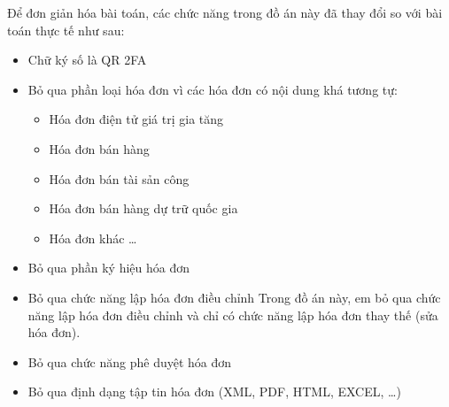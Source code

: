 Để đơn giản hóa bài toán, các chức năng trong đồ án này đã thay đổi so với bài toán thực tế như sau:

\begin{itemize}

    \item Chữ ký số là QR 2FA





    \item Bỏ qua phần loại hóa đơn vì các hóa đơn có nội dung khá tương tự:

          \begin{itemize}

              \item Hóa đơn điện tử giá trị gia tăng

              \item Hóa đơn bán hàng

              \item Hóa đơn bán tài sản công

              \item Hóa đơn bán hàng dự trữ quốc gia

              \item Hóa đơn khác \dots

          \end{itemize}

    \item Bỏ qua phần ký hiệu hóa đơn


    \item  Bỏ qua chức năng lập hóa đơn điều chỉnh
          Trong đồ án này,  em bỏ qua chức năng lập hóa đơn điều chỉnh và chỉ có chức năng lập hóa đơn thay thế (sửa hóa đơn).
    \item   Bỏ qua chức năng phê duyệt hóa đơn

    \item Bỏ qua định dạng tập tin hóa đơn (XML, PDF, HTML, EXCEL, \dots)

\end{itemize}